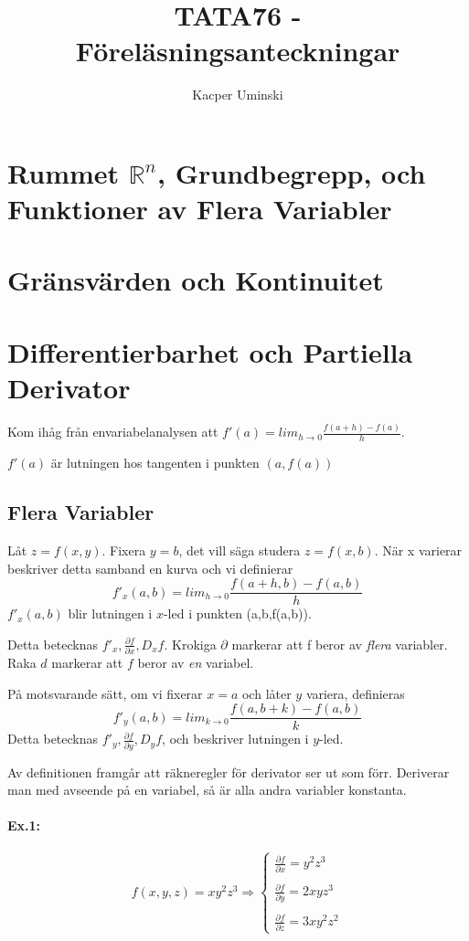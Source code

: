 \documentclass[a4paper,12pt]{article}
\title{TATA76 - Föreläsningsanteckningar}
\author{Kacper Uminski}
\date{}
\newcommand{\partialfrac}[2]{\frac{\partial #1}{\partial #2}}
\begin{document}
\begin{titlepage}
  \clearpage
  \maketitle
  \thispagestyle{empty}
\end{titlepage}
\section{Rummet $\mathbb{R}^n$, Grundbegrepp, och Funktioner av Flera Variabler}
\section{Gränsvärden och Kontinuitet}
\section{Differentierbarhet och Partiella Derivator}
Kom ihåg från envariabelanalysen att
$f'(a) = lim_{h \to 0}\frac{f(a+h)-f(a)}{h}$.

$f'(a)$ är lutningen hos tangenten i punkten $(a,f(a))$
\subsection{Flera Variabler}
Låt $z=f(x,y)$. Fixera $y=b$, det vill säga studera $z=f(x,b)$. När x varierar
beskriver detta samband en kurva och vi definierar
\begin{equation}
  f'_x(a,b) = lim_{h \to 0}\frac{f(a+h,b)-f(a,b)}{h}
\end{equation}
$f'_x(a,b)$ blir lutningen i $x$-led i punkten (a,b,f(a,b)).

Detta betecknas $f'_x, \partialfrac{f}{x}, D_xf$. Krokiga $\partial$
markerar att f beror av \textit{flera} variabler. Raka $d$ markerar att $f$
beror av \textit{en} variabel.

På motsvarande sätt, om vi fixerar $x=a$ och låter $y$ variera, definieras
\begin{equation*}
  f'_y(a,b) = lim_{k \to 0}\frac{f(a,b+k)-f(a,b)}{k}
\end{equation*}
Detta betecknas $f'_y, \partialfrac{f}{y}, D_yf$, och beskriver
lutningen i $y$-led.

Av definitionen framgår att räkneregler för derivator ser ut som förr. Deriverar
man med avseende på en variabel, så är alla andra variabler konstanta.

\paragraph{Ex.1:}
  \begin{equation*}
    f(x,y,z) = xy^2z^3 \Rightarrow 
    \begin{cases}
      \partialfrac{f}{x}=y^2z^3\\ \\
      \partialfrac{f}{y}=2xyz^3\\ \\
      \partialfrac{f}{z}=3xy^2z^2
    \end{cases}
  \end{equation*}
\end{document}
